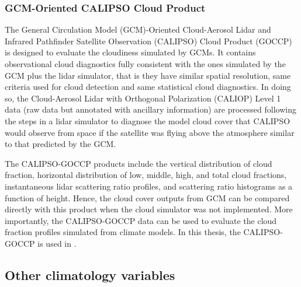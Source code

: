 \subsubsection{GCM-Oriented CALIPSO Cloud Product}

The General Circulation Model (GCM)-Oriented Cloud-Aerosol Lidar and Infrared Pathfinder Satellite Observation (CALIPSO) Cloud Product (GOCCP) \citep[CALIPSO-GOCCP hereafter;][]{Chepfer2010} is designed to evaluate the cloudiness simulated by GCMs. It contains observational cloud diagnostics fully consistent with the ones simulated by the GCM plus the lidar simulator, that is they have similar spatial resolution, same criteria used for cloud detection and same statistical cloud diagnostics. In doing so, the Cloud-Aerosol Lidar with Orthogonal Polarization (CALIOP) Level 1 data (raw data but annotated with ancillary information) are processed following the steps in a lidar simulator to diagnose the model cloud cover that CALIPSO would observe from space if the satellite was flying above the atmosphere similar to that predicted by the GCM. 

The CALIPSO-GOCCP products include the vertical distribution of cloud fraction, horizontal distribution of low, middle, high, and total cloud fractions, instantaneous lidar scattering ratio profiles, and scattering ratio histograms as a function of height. Hence, the cloud cover outputs from GCM can be compared directly with this product when the cloud simulator was not implemented. More importantly, the CALIPSO-GOCCP data can be used to evaluate the cloud fraction profiles simulated from climate models. In this thesis, the CALIPSO-GOCCP is used in .

\subsection{Other climatology variables}



